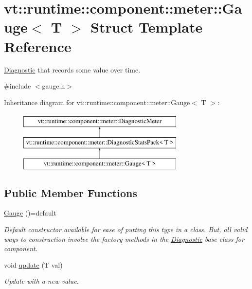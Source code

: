 \hypertarget{structvt_1_1runtime_1_1component_1_1meter_1_1_gauge}{}\section{vt\+:\+:runtime\+:\+:component\+:\+:meter\+:\+:Gauge$<$ T $>$ Struct Template Reference}
\label{structvt_1_1runtime_1_1component_1_1meter_1_1_gauge}


\hyperlink{structvt_1_1runtime_1_1component_1_1_diagnostic}{Diagnostic} that records some value over time.  




{\ttfamily \#include $<$gauge.\+h$>$}

Inheritance diagram for vt\+:\+:runtime\+:\+:component\+:\+:meter\+:\+:Gauge$<$ T $>$\+:\begin{figure}[H]
\begin{center}
\leavevmode
\includegraphics[height=3.000000cm]{structvt_1_1runtime_1_1component_1_1meter_1_1_gauge}
\end{center}
\end{figure}
\subsection*{Public Member Functions}
\begin{DoxyCompactItemize}
\item 
\hyperlink{structvt_1_1runtime_1_1component_1_1meter_1_1_gauge_a39b552111951ca991e92b7a3886e7d97}{Gauge} ()=default
\begin{DoxyCompactList}\small\item\em Default constructor available for ease of putting this type in a class. But, all valid ways to construction involve the factory methods in the {\ttfamily \hyperlink{structvt_1_1runtime_1_1component_1_1_diagnostic}{Diagnostic}} base class for component. \end{DoxyCompactList}\item 
void \hyperlink{structvt_1_1runtime_1_1component_1_1meter_1_1_gauge_a60af475569c49b999e8fbc4c80a788ce}{update} (T val)
\begin{DoxyCompactList}\small\item\em Update with a new value. \end{DoxyCompactList}\end{DoxyCompactItemize}
